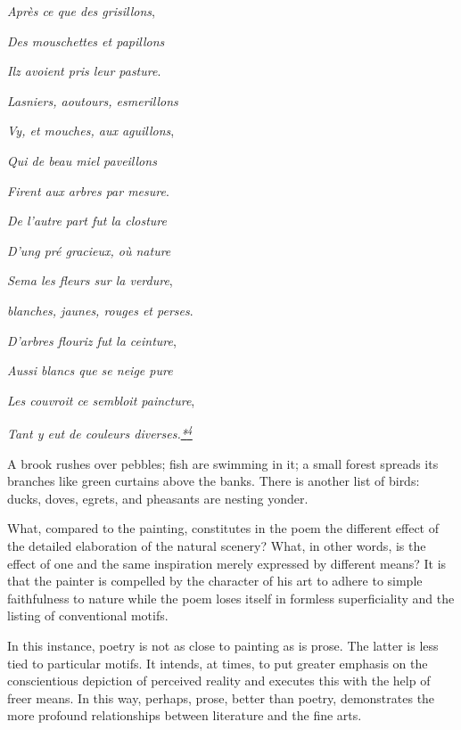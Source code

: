 \emph{Après ce que des grisillons},

\emph{Des mouschettes et papillons}

\emph{Ilz avoient pris leur pasture}.

\emph{Lasniers, aoutours, esmerillons}

\emph{Vy, et mouches, aux aguillons},

\emph{Qui de beau miel paveillons}

\emph{Firent aux arbres par mesure}.

\emph{De l'autre part fut la closture}

\emph{D'ung pré gracieux, où nature}

\emph{Sema les fleurs sur la verdure},

\emph{blanches, jaunes, rouges et perses}.

\emph{D'arbres flouriz fut la ceinture},

\emph{Aussi blancs que se neige pure}

\emph{Les couvroit ce sembloit paincture},

\emph{Tant y eut de couleurs
diverses.\protect\hypertarget{21_Chapter_Thirteen__IMAGE_AND_WORD.xhtmlux5cux23id_2711}{\protect\hyperlink{23_NOTES.xhtmlux5cux23id_2712}{*\textsuperscript{4}}}}

\protect\hypertarget{21_Chapter_Thirteen__IMAGE_AND_WORD.xhtmlux5cux23page_341}{}{}A
brook rushes over pebbles; fish are swimming in it; a small forest
spreads its branches like green curtains above the banks. There is
another list of birds: ducks, doves, egrets, and pheasants are nesting
yonder.

What, compared to the painting, constitutes in the poem the different
effect of the detailed elaboration of the natural scenery? What, in
other words, is the effect of one and the same inspiration merely
expressed by different means? It is that the painter is compelled by the
character of his art to adhere to simple faithfulness to nature while
the poem loses itself in formless superficiality and the listing of
conventional motifs.

In this instance, poetry is not as close to painting as is prose. The
latter is less tied to particular motifs. It intends, at times, to put
greater emphasis on the conscientious depiction of perceived reality and
executes this with the help of freer means. In this way, perhaps, prose,
better than poetry, demonstrates the more profound relationships between
literature and the fine arts.

